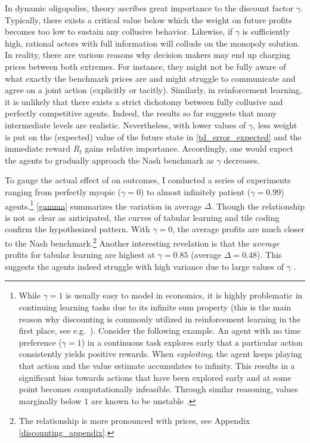 In dynamic oligopolies, theory ascribes great importance to the discount factor $\gamma$. Typically, there exists a critical value below which the weight on future profits becomes too low to sustain any collusive behavior. Likewise, if $\gamma$ is sufficiently high, rational actors with full information will collude on the monopoly solution. In reality, there are various reasons why decision makers may end up charging prices between both extremes. For instance, they might not be fully aware of what exactly the benchmark prices are and might struggle to communicate and agree on a joint action (explicitly or tacitly). Similarly, in reinforcement learning, it is unlikely that there exists a strict dichotomy between fully collusive and perfectly competitive agents. Indeed, the results so far suggests that many intermediate levels are realistic. Nevertheless, with lower values of $\gamma$, less weight is put on the (expected) value of the future state in \autoref{td_error_expected} and the immediate reward $R_t$ gains relative importance. Accordingly, one would expect the agents to gradually approach the Nash benchmark as $\gamma$ decreases.

To gauge the actual effect of on outcomes, I conducted a series of experiments ranging from perfectly myopic ($\gamma =0$) to almost infinitely patient ($\gamma = 0.99$) agents.\footnote{While $\gamma = 1$ is usually easy to model in economics, it is highly problematic in continuing learning tasks due to its infinite sum property (this is the main reason why discounting is commonly utilized in reinforcement learning in the first place, see e.g.\ \textcite{schwartz_reinforcement_1993}). Consider the following example. An agent with no time preference ($\gamma = 1$) in a continuous task explores  early that a particular action consistently yields positive rewards. When \emph{exploiting}, the agent keeps playing that action and the value estimate accumulates to infinity. This results in a significant bias towards actions that have been explored early and at some point becomes computationally infeasible. Through similar reasoning, values marginally below $1$ are known to be unstable \parencite{naik_discounted_2019}.} \autoref{gamma} summarizes the variation in average $\Delta$. Though the relationship is not as clear as anticipated, the curves of tabular learning and tile coding confirm the hypothesized pattern. With $\gamma = 0$, the average profits are much closer to the Nash benchmark.\footnote{The relationship is more pronounced with prices, see Appendix \ref{discounting_appendix}.} Another interesting revelation is that the \emph{average} profits for tabular learning are highest at $\gamma = 0.85$ (average $\Delta = 0.48$). This suggests the agents indeed struggle with high variance due to large values of $\gamma$ \parencite{naik_discounted_2019}.

